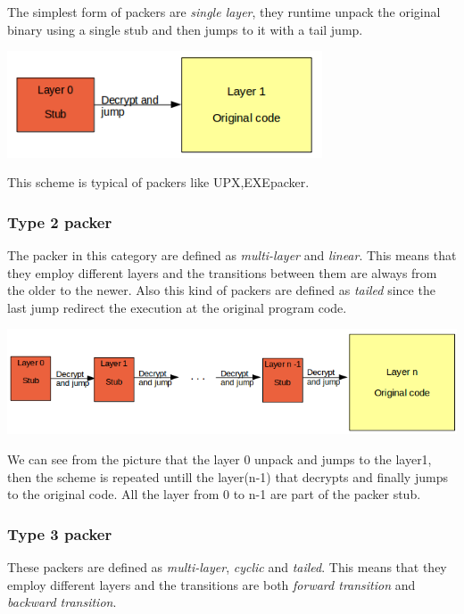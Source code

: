 The simplest form of packers are \textit{single layer}, they runtime unpack the original binary using a single stub and then jumps to it with a tail jump. 

\includegraphics[width=0.7\textwidth]{pictures/packer_type_1.png} 

This scheme is typical of packers like UPX,EXEpacker.

\subsubsection{Type 2 packer}

The packer in this category are defined as \textit{multi-layer} and \textit{linear}. This means that they employ different layers and the transitions between them are always from the older to the newer. Also this kind of packers are defined as \textit{tailed} since the last jump redirect the execution at the original program code.

\includegraphics[width=1\textwidth]{pictures/packer_type_2.png}

We can see from the picture that the layer 0 unpack and jumps to the layer1, then the scheme is repeated untill the layer(n-1) that decrypts and finally jumps to the original code. All the layer from 0 to n-1 are part of the packer stub.

\subsubsection{Type 3 packer}

These packers are defined as \textit{multi-layer}, \textit{cyclic} and \textit{tailed}. This means that they employ different layers and the transitions are both \textit{forward transition} and \textit{backward transition}.  

